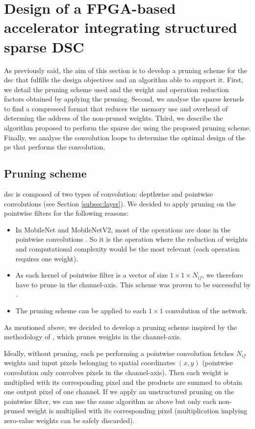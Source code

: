 \section{Design of a FPGA-based accelerator integrating structured sparse DSC} \label{sec:design}
%
As previously said,  the aim of this section is to develop a pruning scheme for the \acrshort{dsc} that fulfills the design objectives and an algorithm able to support it. First, we detail the pruning scheme used and the weight and operation reduction factors obtained by applying the pruning. Second, we analyse the sparse kernels to find a compressed format that reduces the memory use and overhead of determing the address of the non-pruned weights. Third, we describe the algorithm proposed to perform the sparse \acrshort{dsc} using the proposed pruning scheme. Finally, we analyse the convolution loops to determine the optimal design of the \acrshort{pe} that performs the convolution.
%
\subsection{Pruning scheme} \label{subsec:pscheme}
%
\acrshort{dsc} is composed of two types of convolution: depthwise and pointwise convolutions (see Section \ref{subsec:layer}). We decided to apply pruning on the pointwise filters for the following reasons:
%
\begin{itemize}
    \item In MobileNet and MobileNetV2, most of the operations are done in the pointwise convolutions \cite{zhang_channel_2019, tu_pruning_2019}. So it is the operation where the reduction of weights and computational complexity would be the most relevant (each operation requires one weight).
    \item As each kernel of pointwise filter is a vector of size $1 \times 1  \times N_{if}$, we therefore have to prune in the channel-axis. This scheme was proven to be successful by \textcite{kang_accelerator-aware_2020}.
    \item The pruning scheme can be applied to each $1 \times 1$ convolution of the network.
\end{itemize}
%
As mentioned above, we decided to develop a pruning scheme inspired by the methodology of \textcite{kang_accelerator-aware_2020}, which prunes weights in the channel-axis.

Ideally, without pruning, each \acrshort{pe} performing a pointwise convolution fetches $N_{if}$ weights and input pixels belonging to spatial coordinates $(x, y)$ (pointwise convolution only convolves pixels in the channel-axis). Then each weight is multiplied with its corresponding pixel and the products are summed to obtain one output pixel of one channel. If we apply an unstructured pruning on the pointwise filter, we can use the same algorithm as above but only each non-pruned weight is multiplied with its corresponding pixel (multiplication implying zero-value weights can be safely discarded).

